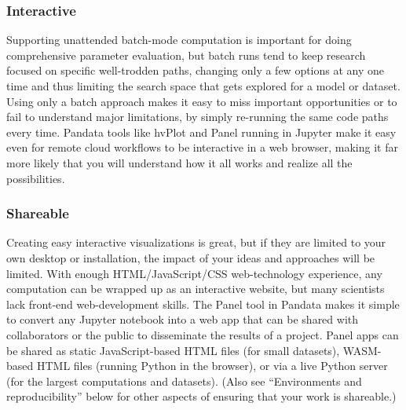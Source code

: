 \subsubsection{Interactive}
Supporting unattended batch-mode computation is important for doing comprehensive parameter evaluation, but batch runs tend to keep research focused on specific well-trodden paths, changing only a few options at any one time and thus limiting the search space that gets explored for a model or dataset. Using only a batch approach makes it easy to miss important opportunities or to fail to understand major limitations, by simply re-running the same code paths every time. Pandata tools like hvPlot and Panel running in Jupyter make it easy even for remote cloud workflows to be interactive in a web browser, making it far more likely that you will understand how it all works and realize all the possibilities.

\subsubsection{Shareable}
Creating easy interactive visualizations is great, but if they are limited to your own desktop or installation, the impact of your ideas and approaches will be limited. With enough HTML/JavaScript/CSS web-technology experience, any computation can be wrapped up as an interactive website, but many scientists lack front-end web-development skills. The Panel tool in Pandata makes it simple to convert any Jupyter notebook into a web app that can be shared with collaborators or the public to disseminate the results of a project. Panel apps can be shared as static JavaScript-based HTML files (for small datasets), WASM-based HTML files (running Python in the browser), or via a live Python server (for the largest computations and datasets). (Also see ``Environments and reproducibility'' below for other aspects of ensuring that your work is shareable.)

